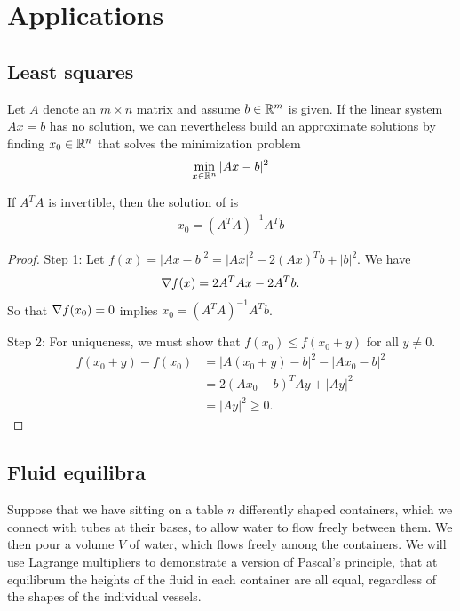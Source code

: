 \section{Applications}

\subsection{Least squares}

Let $A$ denote an $m \times n$ matrix and assume $b \in \mathbb{R}^m$ is given.
If the linear system $Ax = b$ has no solution, we can nevertheless build an approximate solutions by finding $x_0 \in \mathbb{R}^n$ that solves the minimization problem
\begin{align}
\min _{x \in \R^n} |Ax-b|^2 \labeq{least_squares}
\end{align}

\begin{theorem}
If $A^T A$ is invertible, then the solution of  is
\begin{align}
x_0 = (A^T A)^{-1} A^T b
\end{align}
\end{theorem}

\begin{proof}
Step 1:
Let $f(x) = |Ax-b|^2 = |Ax|^2 - 2 (Ax)^T b + |b|^2$.
We have
\begin{align}
\nabla f(x) = 2 A^T A x - 2 A^T b.
\end{align}
So that $\nabla f(x_0) = 0$ implies $x_0 = (A^T A)^{-1} A^T b$.

Step 2:
For uniqueness, we must show that $f(x_0) \le f(x_0 + y)$ for all $y \ne 0$.
\begin{align}
f(x_0+y)-f(x_0) &= |A(x_0+y) -b|^2 - |Ax_0-b|^2 \\
&= 2 (Ax_0-b)^TAy+|Ay|^2 \nonumber \\
&= |Ay|^2 \ge 0. \nonumber
\end{align}
\end{proof}

\subsection{Fluid equilibra}

Suppose that we have sitting on a table $n$ differently shaped containers, which we connect with tubes at their bases, to allow water to flow freely between them.
We then pour a volume $V$ of water, which flows freely among the containers.
We will use Lagrange multipliers to demonstrate a version of Pascal's principle, that at equilibrum the heights of the fluid in each container are all equal, regardless of the shapes of the individual vessels.

